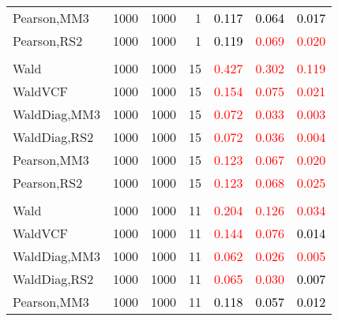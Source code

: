 \documentclass[
]{article}
\begin{document}
\begin{table}[H]
{\begin{tabular}[t]{lrrrrrr}
\hspace{1em}Pearson,MM3 & 1000 & 1000 & 1 & \textcolor{black}{0.117} & \textcolor{black}{0.064} & \textcolor{black}{0.017}\\
\hspace{1em}Pearson,RS2 & 1000 & 1000 & 1 & \textcolor{black}{0.119} & \textcolor{red}{0.069} & \textcolor{red}{0.020}\\
\addlinespace[0.3em]
\multicolumn{7}{l}{\textbf{1F 15V}}\\
\hspace{1em}Wald & 1000 & 1000 & 15 & \textcolor{red}{0.427} & \textcolor{red}{0.302} & \textcolor{red}{0.119}\\
\hspace{1em}WaldVCF & 1000 & 1000 & 15 & \textcolor{red}{0.154} & \textcolor{red}{0.075} & \textcolor{red}{0.021}\\
\hspace{1em}WaldDiag,MM3 & 1000 & 1000 & 15 & \textcolor{red}{0.072} & \textcolor{red}{0.033} & \textcolor{red}{0.003}\\
\hspace{1em}WaldDiag,RS2 & 1000 & 1000 & 15 & \textcolor{red}{0.072} & \textcolor{red}{0.036} & \textcolor{red}{0.004}\\
\hspace{1em}Pearson,MM3 & 1000 & 1000 & 15 & \textcolor{red}{0.123} & \textcolor{red}{0.067} & \textcolor{red}{0.020}\\
\hspace{1em}Pearson,RS2 & 1000 & 1000 & 15 & \textcolor{red}{0.123} & \textcolor{red}{0.068} & \textcolor{red}{0.025}\\
\addlinespace[0.3em]
\multicolumn{7}{l}{\textbf{2F 10V}}\\
\hspace{1em}Wald & 1000 & 1000 & 11 & \textcolor{red}{0.204} & \textcolor{red}{0.126} & \textcolor{red}{0.034}\\
\hspace{1em}WaldVCF & 1000 & 1000 & 11 & \textcolor{red}{0.144} & \textcolor{red}{0.076} & \textcolor{black}{0.014}\\
\hspace{1em}WaldDiag,MM3 & 1000 & 1000 & 11 & \textcolor{red}{0.062} & \textcolor{red}{0.026} & \textcolor{red}{0.005}\\
\hspace{1em}WaldDiag,RS2 & 1000 & 1000 & 11 & \textcolor{red}{0.065} & \textcolor{red}{0.030} & \textcolor{black}{0.007}\\
\hspace{1em}Pearson,MM3 & 1000 & 1000 & 11 & \textcolor{black}{0.118} & \textcolor{black}{0.057} & \textcolor{black}{0.012}\\

\end{tabular}}
\end{table}
\end{document}
